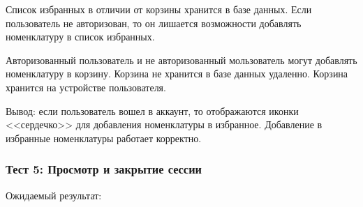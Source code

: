 
Список избранных в отличии от корзины хранится в базе данных.
Если пользователь не авторизован, то он лишается возможности добавлять номенклатуру в список избранных.

Авторизованный пользователь и не авторизованный мользователь могут добавлять номенклатуру в корзину.
Корзина не хранится в базе данных удаленно. Корзина хранится на устройстве пользователя.

Вывод: если пользователь вошел в аккаунт, то отображаются иконки <<сердечко>> для добавления номенклатуры в избранное.
Добавление в избранные номенклатуры работает корректно.

\subsubsection*{Тест 5: Просмотр и закрытие сессии}

Ожидаемый результат:






